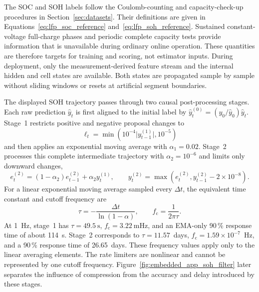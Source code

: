 \documentclass[
    a4paper,
    12pt,
    titlepage,
    bibliography=totoc,
    twoside=on,
    parskip=false,
    numbers=noenddot,
    cleardoublepage=empty,
    DIV=12,
    BCOR=12.0mm,
    headheight=36pt,
    headings=openright
]{scrreprt}
\begin{document}
The SOC and SOH labels follow the Coulomb-counting and capacity-check-up procedures in Section~\ref{sec:datasets}. Their definitions are given in Equations~\ref{eq:lfp_soc_reference} and~\ref{eq:lfp_soh_reference}. Sustained constant-voltage full-charge phases and periodic complete capacity tests provide information that is unavailable during ordinary online operation. These quantities are therefore targets for training and scoring, not estimator inputs. During deployment, only the measurement-derived feature stream and the internal hidden and cell states are available. Both states are propagated sample by sample without sliding windows or resets at artificial segment boundaries.

The displayed SOH trajectory passes through two causal post-processing stages. Each raw prediction $\hat y_t$ is first aligned to the initial label by $\hat y_t^{(0)}=(y_0/\hat y_0)\hat y_t$. Stage~1 restricts positive and negative proposal changes to
\begin{equation}
    \ell_t=\min\!\left(10^{-4}\lvert y_{t-1}^{(1)}\rvert,10^{-5}\right)
\end{equation}
and then applies an exponential moving average with $\alpha_1=0.02$. Stage~2 processes this complete intermediate trajectory with $\alpha_2=10^{-6}$ and limits only downward changes,
\begin{equation}
    e_t^{(2)}=(1-\alpha_2)e_{t-1}^{(2)}+\alpha_2y_t^{(1)}, \qquad
    y_t^{(2)}=\max\!\left(e_t^{(2)},y_{t-1}^{(2)}-2\times10^{-8}\right).
    \label{eq:embedded_soh_filter}
\end{equation}
For a linear exponential moving average sampled every $\Delta t$, the equivalent time constant and cutoff frequency are
\begin{equation}
    \tau=-\frac{\Delta t}{\ln(1-\alpha)}, \qquad f_{\mathrm c}=\frac{1}{2\pi\tau}.
    \label{eq:embedded_ema_characteristics}
\end{equation}
At \SI{1}{\hertz}, stage~1 has $\tau=\SI{49.5}{\second}$, $f_{\mathrm c}=\SI{3.22}{\milli\hertz}$, and an EMA-only 90\,\% response time of about \SI{114}{\second}. Stage~2 corresponds to $\tau=11.57$~days, $f_{\mathrm c}=1.59\times10^{-7}$~Hz, and a 90\,\% response time of 26.65~days. These frequency values apply only to the linear averaging elements. The rate limiters are nonlinear and cannot be represented by one cutoff frequency. Figure~\ref{fig:embedded_app_soh_filter} later separates the influence of compression from the accuracy and delay introduced by these stages.
\end{document}
